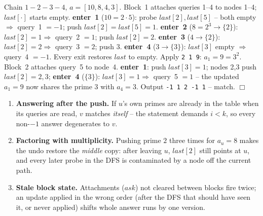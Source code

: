 \begin{tracebox}
Chain \(1\!-\!2\!-\!3\!-\!4\), \(a=[10,8,4,3]\).  Block~1 attaches queries
1--4 to nodes 1--4; \(\mathit{last}[\cdot]\) starts empty. \quad
\textbf{enter~1} (\(10=2{\cdot}5\)): probe \(\mathit{last}[2],\mathit{last}[5]\)
-- both empty \(\Rightarrow\) query~1 \(=\boxed{-1}\); push
\(\mathit{last}[2]=\mathit{last}[5]=1\). \quad
\textbf{enter~2} (\(8=2^3\to\{2\}\)): \(\mathit{last}[2]=1\Rightarrow\)
query~2 \(=\boxed{1}\); push \(\mathit{last}[2]=2\). \quad
\textbf{enter~3} (\(4\to\{2\}\)): \(\mathit{last}[2]=2\Rightarrow\) query~3
\(=\boxed{2}\); push \(3\). \quad
\textbf{enter~4} (\(3\to\{3\}\)): \(\mathit{last}[3]\) empty \(\Rightarrow\)
query~4 \(=\boxed{-1}\).  Every exit restores \(\mathit{last}\) to empty. \quad
Apply \texttt{2 1 9}: \(a_1=9=3^2\).  Block~2 attaches query~5 to node~4.
\textbf{enter~1}: push \(\mathit{last}[3]=1\); nodes 2,3 push
\(\mathit{last}[2]=2,3\); \textbf{enter~4} (\(\{3\}\)):
\(\mathit{last}[3]=1\Rightarrow\) query~5 \(=\boxed{1}\) -- the updated
\(a_1=9\) now shares the prime 3 with \(a_4=3\).  Output
\texttt{-1 1 2 -1 1} -- match. \(\Box\)
\end{tracebox}

\begin{warningbox}
\begin{enumerate}[nosep,leftmargin=1.6em]
  \item \textbf{Answering after the push.} If \(u\)'s own primes are already
        in the table when its queries are read, \(v\) matches \emph{itself} --
        the statement demands \(i<k\), so every non-\(-1\) answer degenerates
        to \(v\).
  \item \textbf{Factoring with multiplicity.} Pushing prime \(2\) three times
        for \(a_u=8\) makes the undo restore the \emph{middle} copy: after
        leaving \(u\), \(\mathit{last}[2]\) still points at \(u\), and every
        later probe in the DFS is contaminated by a node off the current path.
  \item \textbf{Stale block state.} Attachments (\(\mathit{ask}\)) not cleared
        between blocks fire twice; an update applied in the wrong order (after
        the DFS that should have seen it, or never applied) shifts whole
        answer runs by one version.
\end{enumerate}
\end{warningbox}

